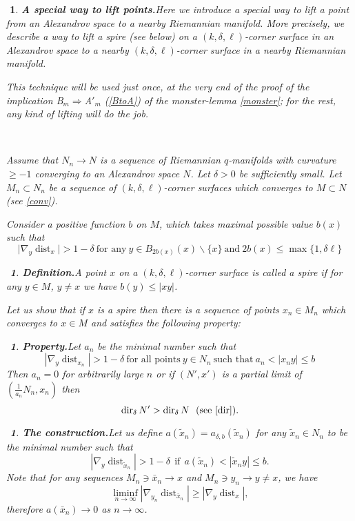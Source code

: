 \documentclass{article}
\def\ge{\geqslant}
\def\le{\leqslant}
\def\i{\subset}
\def\dir{\operatorname{dir}}
\def\dist{\operatorname{dist}}
\newtheorem{Nothing}[thm]{$\!\!\!$}
\newenvironment{nothing}{\begin{Nothing}\rm}{\end{Nothing}}
\begin{document}
\begin{nothing}{\bf A special way to lift points.}\label{approx}
Here we introduce a special way to lift a point from an Alexandrov space to a nearby
Riemannian manifold.
More precisely, we describe a way to lift a spire (see below)
on a $(k,\delta,\ell)$-corner surface in an Alexandrov space to
a nearby $(k,\delta,\ell)$-corner surface in a nearby Riemannian manifold.

This technique will be used just once, at the very end of the proof
of the implication
B$_{m} \Rightarrow$A$'_m$ (\ref{BtoA}) of the monster-lemma \ref{monster};
for the rest, any kind of lifting will do the job.

\

Assume that $N_n\to N$ is a sequence of Riemannian $q$-manifolds with curvature $\ge -1$ converging to an Alexandrov space $N$.
Let $\delta>0$ be sufficiently small.
Let $M_n\i N_n$ be a sequence of  $(k,\delta,\ell)$-corner surfaces which converges to $M\i N$ (see \ref{conv}).

Consider a positive function $b$ on $M$, which takes maximal possible value $b(x)$ such that
$$\bigl|\nabla_y\dist_x\bigr|> 1-\delta\ \text{for any}\  y\in B_{2b(x)}(x)\backslash \{x\}\ \text{and}\ 2b(x)\le\max\{1,\delta\ell\}$$

\begin{Nothing}{\bf Definition.}\label{spire}
A point $x$ on a $(k,\delta,\ell)$-corner surface is called a spire if for any $y\in M$, $y\not=x$ we have $b(y)\le |x y|$.
\end{Nothing}

Let us show that if $x$ is a spire then there is a sequence of points $x_n\in M_n$ which converges to $x\in M$ and satisfies the following property:



\begin{Nothing}
{\bf Property.}\label{property} Let $a_n$ be the minimal number such that
$$|\nabla_y\dist_{x_n}|> 1-\delta\ \text{for all points}\ y\in N_n \ \text{such that}\  a_n<|x_n y|\le b$$
Then $a_n=0$ for arbitrarily large $n$ or if
$(N', x')$ is a partial limit of $(\frac1{a_n}N_n, x_n)$ then
$$\dir_\delta N'>\dir_\delta N \ \ \text{(see \ref{dir})}.$$

\end{Nothing}

\begin{nothing}{\bf The construction.}\label{constr}
Let us define $a(\tilde x_n)=a_{\delta,b}(\tilde x_n)$ for any $\tilde x_n\in N_n$ to be the minimal number such that
$$|\nabla_y\dist_{\tilde x_n}|> 1-\delta\ \  \text{if}\ \ a(\tilde x_n)<|\tilde  x_n y|\le b.$$
Note that for any sequences $M_n\ni \bar x_n\to x$ and $M_n\ni y_n\to y\not= x$, we have
$$\liminf_{n\to\infty}|\nabla_{y_n}\dist_{\bar x_n}|\ge |\nabla_y\dist_{x}|,$$
therefore $a(\bar x_n)\to 0$ as $n\to \infty$.


\end{nothing}
\end{nothing}
\end{document}
